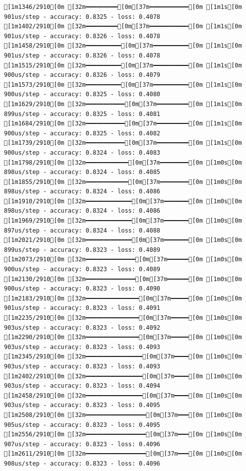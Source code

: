 \documentclass[
  letterpaper,
  DIV=11,
  numbers=noendperiod]{scrartcl}
\begin{document}
\begin{verbatim}
[1m1346/2910[0m [32m━━━━━━━━━[0m[37m━━━━━━━━━━━[0m [1m1s[0m 901us/step - accuracy: 0.8325 - loss: 0.4078
[1m1402/2910[0m [32m━━━━━━━━━[0m[37m━━━━━━━━━━━[0m [1m1s[0m 901us/step - accuracy: 0.8326 - loss: 0.4078
[1m1458/2910[0m [32m━━━━━━━━━━[0m[37m━━━━━━━━━━[0m [1m1s[0m 901us/step - accuracy: 0.8326 - loss: 0.4078
[1m1515/2910[0m [32m━━━━━━━━━━[0m[37m━━━━━━━━━━[0m [1m1s[0m 900us/step - accuracy: 0.8326 - loss: 0.4079
[1m1573/2910[0m [32m━━━━━━━━━━[0m[37m━━━━━━━━━━[0m [1m1s[0m 900us/step - accuracy: 0.8325 - loss: 0.4080
[1m1629/2910[0m [32m━━━━━━━━━━━[0m[37m━━━━━━━━━[0m [1m1s[0m 899us/step - accuracy: 0.8325 - loss: 0.4081
[1m1684/2910[0m [32m━━━━━━━━━━━[0m[37m━━━━━━━━━[0m [1m1s[0m 900us/step - accuracy: 0.8325 - loss: 0.4082
[1m1739/2910[0m [32m━━━━━━━━━━━[0m[37m━━━━━━━━━[0m [1m1s[0m 900us/step - accuracy: 0.8324 - loss: 0.4083
[1m1798/2910[0m [32m━━━━━━━━━━━━[0m[37m━━━━━━━━[0m [1m0s[0m 898us/step - accuracy: 0.8324 - loss: 0.4085
[1m1855/2910[0m [32m━━━━━━━━━━━━[0m[37m━━━━━━━━[0m [1m0s[0m 898us/step - accuracy: 0.8324 - loss: 0.4086
[1m1910/2910[0m [32m━━━━━━━━━━━━━[0m[37m━━━━━━━[0m [1m0s[0m 898us/step - accuracy: 0.8324 - loss: 0.4086
[1m1969/2910[0m [32m━━━━━━━━━━━━━[0m[37m━━━━━━━[0m [1m0s[0m 897us/step - accuracy: 0.8324 - loss: 0.4088
[1m2021/2910[0m [32m━━━━━━━━━━━━━[0m[37m━━━━━━━[0m [1m0s[0m 899us/step - accuracy: 0.8323 - loss: 0.4089
[1m2073/2910[0m [32m━━━━━━━━━━━━━━[0m[37m━━━━━━[0m [1m0s[0m 900us/step - accuracy: 0.8323 - loss: 0.4089
[1m2130/2910[0m [32m━━━━━━━━━━━━━━[0m[37m━━━━━━[0m [1m0s[0m 900us/step - accuracy: 0.8323 - loss: 0.4090
[1m2183/2910[0m [32m━━━━━━━━━━━━━━━[0m[37m━━━━━[0m [1m0s[0m 901us/step - accuracy: 0.8323 - loss: 0.4091
[1m2235/2910[0m [32m━━━━━━━━━━━━━━━[0m[37m━━━━━[0m [1m0s[0m 903us/step - accuracy: 0.8323 - loss: 0.4092
[1m2290/2910[0m [32m━━━━━━━━━━━━━━━[0m[37m━━━━━[0m [1m0s[0m 903us/step - accuracy: 0.8323 - loss: 0.4093
[1m2345/2910[0m [32m━━━━━━━━━━━━━━━━[0m[37m━━━━[0m [1m0s[0m 903us/step - accuracy: 0.8323 - loss: 0.4093
[1m2402/2910[0m [32m━━━━━━━━━━━━━━━━[0m[37m━━━━[0m [1m0s[0m 903us/step - accuracy: 0.8323 - loss: 0.4094
[1m2458/2910[0m [32m━━━━━━━━━━━━━━━━[0m[37m━━━━[0m [1m0s[0m 903us/step - accuracy: 0.8323 - loss: 0.4095
[1m2508/2910[0m [32m━━━━━━━━━━━━━━━━━[0m[37m━━━[0m [1m0s[0m 905us/step - accuracy: 0.8323 - loss: 0.4095
[1m2556/2910[0m [32m━━━━━━━━━━━━━━━━━[0m[37m━━━[0m [1m0s[0m 907us/step - accuracy: 0.8323 - loss: 0.4096
[1m2611/2910[0m [32m━━━━━━━━━━━━━━━━━[0m[37m━━━[0m [1m0s[0m 908us/step - accuracy: 0.8323 - loss: 0.4096

\end{verbatim}
\end{document}
